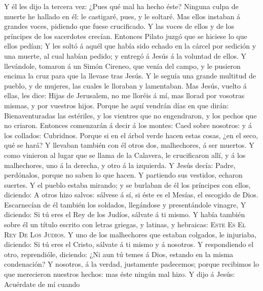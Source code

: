  Y él les dijo la tercera vez: ¿Pues qué mal ha hecho
éste? Ninguna culpa de muerte he hallado en él: le castigaré, pues, y le
soltaré.  Mas ellos instaban á grandes voces, pidiendo
que fuese crucificado. Y las voces de ellos y de los príncipes de los
sacerdotes crecían.  Entonces Pilato juzgó que se hiciese
lo que ellos pedían;  Y les soltó á aquél que había sido
echado en la cárcel por sedición y una muerte, al cual habían pedido; y
entregó á Jesús á la voluntad de ellos.  Y llevándole,
tomaron á un Simón Cireneo, que venía del campo, y le pusieron encima la
cruz para que la llevase tras Jesús.  Y le seguía una
grande multitud de pueblo, y de mujeres, las cuales le lloraban y
lamentaban.  Mas Jesús, vuelto á ellas, les dice: Hijas
de Jerusalem, no me lloréis á mí, mas llorad por vosotras mismas, y por
vuestros hijos.  Porque he aquí vendrán días en que
dirán: Bienaventuradas las estériles, y los vientres que no engendraron,
y los pechos que no criaron.  Entonces comenzarán á decir
á los montes: Caed sobre nosotros: y á los collados: Cubridnos.
 Porque si en el árbol verde hacen estas cosas, ¿en el
seco, qué se hará?  Y llevaban también con él otros dos,
malhechores, á ser muertos.  Y como vinieron al lugar que
se llama de la Calavera, le crucificaron allí, y á los malhechores, uno
á la derecha, y otro á la izquierda.  Y Jesús decía:
Padre, perdónalos, porque no saben lo que hacen. Y partiendo sus
vestidos, echaron suertes.  Y el pueblo estaba mirando; y
se burlaban de él los príncipes con ellos, diciendo: A otros hizo
salvos: sálvese á sí, si éste es el Mesías, el escogido de Dios.
 Escarnecían de él también los soldados, llegándose y
presentándole vinagre,  Y diciendo: Si tú eres el Rey de
los Judíos, sálvate á ti mismo.  Y había también sobre él
un título escrito con letras griegas, y latinas, y hebraicas:
\textsc{Este} \textsc{Es} \textsc{El} \textsc{Rey} \textsc{De}
\textsc{Los} \textsc{Judios}.  Y uno de los malhechores
que estaban colgados, le injuriaba, diciendo: Si tú eres el Cristo,
sálvate á ti mismo y á nosotros.  Y respondiendo el otro,
reprendióle, diciendo: ¿Ni aun tú temes á Dios, estando en la misma
condenación?  Y nosotros, á la verdad, justamente
padecemos; porque recibimos lo que merecieron nuestros hechos: mas éste
ningún mal hizo.  Y dijo á Jesús: Acuérdate de mí cuando
